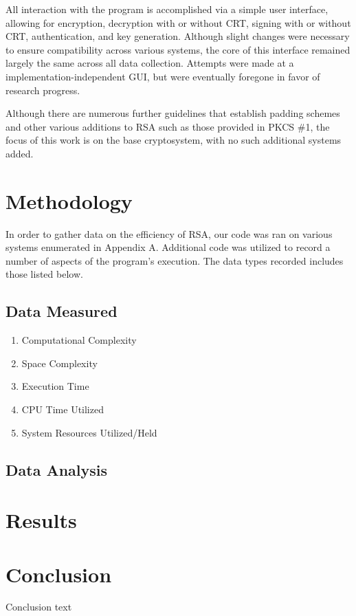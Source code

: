 \documentclass[journal]{IEEEtran}
\begin{document}
All interaction with the program is accomplished via a simple user interface, allowing for encryption, decryption with or without CRT, signing with or without CRT, authentication, and key generation. Although slight changes were necessary to ensure compatibility across various systems, the core of this interface remained largely the same across all data collection. Attempts were made at a implementation-independent GUI, but were eventually foregone in favor of research progress.

Although there are numerous further guidelines that establish padding schemes and other various additions to RSA such as those provided in PKCS \#1, the focus of this work is on the base cryptosystem, with no such additional systems added.

\section{Methodology}
In order to gather data on the efficiency of RSA, our code was ran on various systems enumerated in Appendix A. Additional code was utilized to record a number of aspects of the program's execution. The data types recorded includes those listed below.
\subsection{Data Measured}
\begin{enumerate}
\item{Computational Complexity}
\item{Space Complexity}
\item{Execution Time}
\item{CPU Time Utilized}
\item{System Resources Utilized/Held}
\end{enumerate}

\subsection{Data Analysis}

\section{Results}


\section{Conclusion}
Conclusion text
\end{document}
